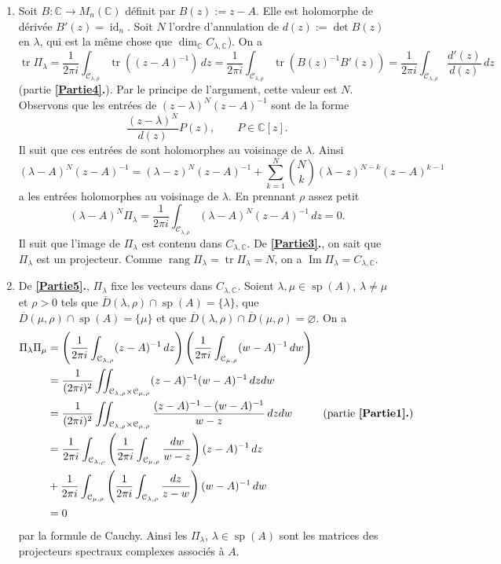 \documentclass[french]{article}
\theoremstyle{definition}
\newcommand{\tuple}[1]{\left(#1\right)}
\newcommand{\ol}[1]{\overline{#1}}
\newcommand{\Cbb}{\mathbb{C}}
\newcommand{\Ccal}{\mathcal{C}}
\newcommand{\tr}{\operatorname{tr}}
\newcommand{\id}{\operatorname{id}}
\newcommand{\spec}{\operatorname{sp}}
\newcommand{\rang}{\operatorname{rang}}
\newcommand{\Img}{\operatorname{Im}}
\begin{document}
\begin{enumerate}
    \item \label{Partie5} Soit $B: \Cbb \to M_n(\Cbb)$ d\'efinit par $B(z):= z - A$. Elle est holomorphe de d\'eriv\'ee $B'(z) = \id_n$. Soit $N $ l'ordre d'annulation de $d(z) := \det B(z)$ en $\lambda$, qui est la m\^eme chose que $\dim_{\Cbb}C_{\lambda,\Cbb}$). 
    On a
        $$\tr \Pi_\lambda = \frac{1}{2\pi i}\int_{\Ccal_{\lambda,\rho}} \tr\tuple{(z-A)^{-1}}\,dz = \frac{1}{2\pi i}\int_{\Ccal_{\lambda,\rho}} \tr \tuple{B(z)^{-1}B'(z)} = \frac{1}{2\pi i} \int_{\Ccal_{\lambda,\rho}} \frac{d'(z)}{d(z)}\,dz$$
    (partie {\bf \ref{Partie4}.}). Par le principe de l'argument, cette valeur est $N$. Observons que les entr\'ees de $(z - \lambda)^N(z-A)^{-1}$   sont de la forme
        $$\dfrac{(z-\lambda)^N}{d(z)}P(z), \qquad P \in \Cbb[z].$$
    Il suit que ces entr\'ees de sont holomorphes au voisinage de $\lambda$. Ainsi
        $$(\lambda - A)^N(z-A)^{-1} = (\lambda-z)^N(z-A)^{-1} + \sum_{k=1}^N \binom{N}{k}(\lambda - z)^{N-k}(z-A)^{k-1}$$
    a les entr\'ees holomorphes au voisinage de $\lambda$. En prennant $\rho$ assez petit
        $$(\lambda - A)^N\Pi_{\lambda} = \frac{1}{2\pi i} \int_{\Ccal_{\lambda,\rho}} (\lambda - A)^N(z-A)^{-1}\,dz = 0.$$
    Il suit que l'image de $\Pi_\lambda$ est contenu dans $C_{\lambda,\Cbb}$. De {\bf \ref{Partie3}.}, on sait que $\Pi_\lambda$ est un projecteur. Comme $\rang \Pi_\lambda = \tr \Pi_\lambda = N$, on a $\Img \Pi_\lambda = C_{\lambda,\Cbb}$.
    
    \item \label{Partie6} De {\bf \ref{Partie5}.}, $\Pi_\lambda$ fixe les vecteurs dans $C_{\lambda,\Cbb}$. Soient $\lambda, \mu \in \spec(A)$, $\lambda \neq \mu$ et $\rho > 0$ tels que $\ol{D}(\lambda,\rho) \cap \spec(A) = \{\lambda\}$, que $\ol{D}(\mu,\rho) \cap \spec(A) = \{\mu\}$ et que $\ol{D}(\lambda,\rho) \cap \ol{D}(\mu,\rho) = \varnothing$. On a
        \begin{align*}
            \allowdisplaybreaks
            \Pi_\lambda \Pi_\mu & = \tuple{\frac{1}{2\pi i} \int_{\Ccal_{\lambda,\rho}} (z - A)^{-1}\,dz}\tuple{\frac{1}{2\pi i} \int_{\Ccal_{\mu,\rho}} (w - A)^{-1}\,dw} \\
            & = \frac{1}{(2\pi i)^2} \iint_{\Ccal_{\lambda,\rho} \times \Ccal_{\mu,\rho}} (z - A)^{-1}(w - A)^{-1} \,dzdw \\
            & = \frac{1}{(2\pi i)^2}\iint_{\Ccal_{\lambda,\rho} \times \Ccal_{\mu,\rho}} \frac{(z - A)^{-1} - (w - A)^{-1}}{w - z}\,dzdw & \text{(partie {\bf\ref{Partie1}.})}\\
            & = \frac{1}{2\pi i}\int_{\Ccal_{\lambda,\rho}} \tuple{\frac{1}{2\pi i}\int_{\Ccal_{\mu,\rho}}\frac{dw}{w - z}} (z-A)^{-1}\,dz \\
            & + \frac{1}{2\pi i}\int_{\Ccal_{\mu,\rho}} \tuple{\frac{1}{2\pi i}\int_{\Ccal_{\lambda,\rho}}\frac{dz}{z - w}} (w-A)^{-1}\,dw\\
            & = 0
        \end{align*}
    par la formule de Cauchy. Ainsi les $\Pi_\lambda$, $\lambda \in \spec(A)$ sont les matrices des projecteurs spectraux complexes associ\'es \`a $A$.
    

\end{enumerate}
\end{document}
